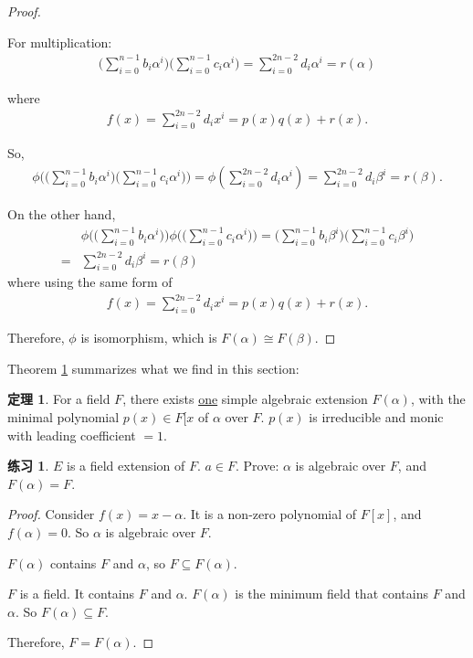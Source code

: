 \documentclass[utf8]{ctexbook}
\theoremstyle{definition}
\newtheorem{prototheorem}{定理}[section]
\newenvironment{theorem}
   {\colorlet{shadecolor}{pink!30}\begin{shaded}\begin{prototheorem}}
   {\end{prototheorem}\end{shaded}}
\newtheorem{exercise}{练习}[section]
\begin{document}
\begin{proof}
\begin{itemize}
{For multiplication:
\begin{align*}
\Big(\sum_{i=0}^{n-1} b_i \alpha^i \Big) \Big( \sum_{i=0}^{n-1} c_i \alpha^i \Big) = \sum_{i=0} ^{2n-2} d_i \alpha^i = r(\alpha)
\end{align*}

where
\begin{align*}
f(x) = \sum_{i=0} ^{2n-2} d_i x^i = p(x) q(x) +  r(x) .
\end{align*}

So,
\begin{align*}
\phi\bigg( \Big(\sum_{i=0}^{n-1} b_i \alpha^i \Big) \Big( \sum_{i=0}^{n-1} c_i \alpha^i \Big) \bigg) = \phi(\sum_{i=0} ^{2n-2} d_i \alpha^i) = \sum_{i=0} ^{2n-2} d_i \beta^i = r(\beta) .
\end{align*}

On the other hand,
\begin{align*}
& \phi\bigg( \Big(\sum_{i=0}^{n-1} b_i \alpha^i \Big) \bigg) \phi \bigg( \Big( \sum_{i=0}^{n-1} c_i \alpha^i \Big) \bigg) = \Big(\sum_{i=0}^{n-1} b_i \beta^i \Big) \Big( \sum_{i=0}^{n-1} c_i \beta^i \Big) \\
= & \sum_{i=0} ^{2n-2} d_i \beta^i = r(\beta)
\end{align*}
where using the same form of
\begin{align*}
f(x) = \sum_{i=0} ^{2n-2} d_i x^i = p(x) q(x) +  r(x) .
\end{align*}
}
\end{itemize}

Therefore, $\phi$ is isomorphism, which is $F(\alpha) \cong F(\beta)$.

\end{proof}


Theorem \ref{theorem_4_2_unique_iso_simple_alge_extension} summarizes what we find in this section:

\begin{theorem}
\label{theorem_4_2_unique_iso_simple_alge_extension}
For a field $F$, there exists \underline{one} simple algebraic extension $F(\alpha)$, with the minimal polynomial $p(x)\in F[x$ of $\alpha$ over $F$. $p(x)$ is irreducible and monic with leading coefficient $=1$.  
\end{theorem}

\begin{exercise}
$E$ is a field extension of $F$. $a \in F$. Prove: $\alpha$ is algebraic over $F$, and $F(\alpha) = F$.
\end{exercise}

\begin{proof}
Consider $f(x) = x - \alpha$. It is a non-zero polynomial of $F[x]$, and $f(\alpha) = 0$. So $\alpha$ is algebraic over $F$.

$F(\alpha)$ contains $F$ and $\alpha$, so $F \subseteq F(\alpha)$.

$F$ is a field. It contains $F$ and $\alpha$. $F(\alpha)$ is the minimum field that contains $F$ and $\alpha$. So $F(\alpha) \subseteq F$.

Therefore, $F = F(\alpha)$.
\end{proof}
\end{document}
